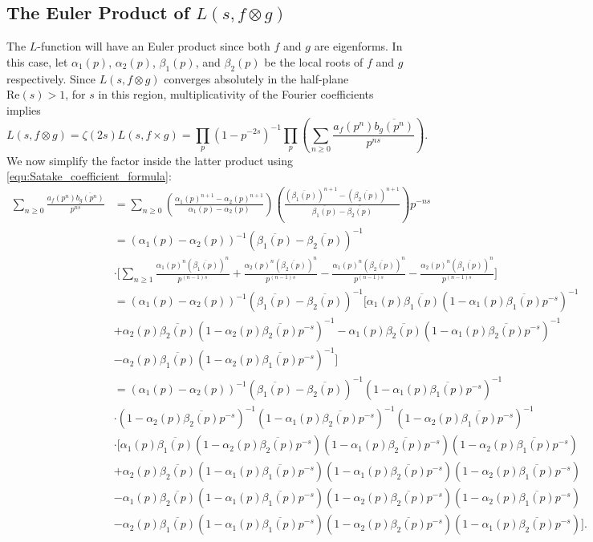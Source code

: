 \documentclass[12pt]{book}
\theoremstyle{definition}\newframedtheorem{method}{Method}
\renewcommand{\a}{\alpha}
\renewcommand{\b}{\beta}
\newcommand{\z}{\zeta}
\newcommand{\x}{\times}
\newcommand{\ox}{\otimes}
\newcommand{\<}{\langle}
\renewcommand{\>}{\rangle}
\newcommand{\conj}{\overline}
\renewcommand{\Re}{\mathrm{Re}}
\begin{document}
    \subsection*{The Euler Product of \texorpdfstring{$L(s,f \ox g)$}{L(s,fxg)}}
      The $L$-function will have an Euler product since both $f$ and $g$ are eigenforms. In this case, let $\a_{1}(p)$, $\a_{2}(p)$, $\b_{1}(p)$, and $\b_{2}(p)$ be the local roots of $f$ and $g$ respectively. Since $L(s,f \ox g)$ converges absolutely in the half-plane $\Re(s) > 1$, for $s$ in this region, multiplicativity of the Fourier coefficients implies
      \[
        L(s,f \ox g) = \z(2s)L(s,f \x g) = \prod_{p}(1-p^{-2s})^{-1}\prod_{p}\left(\sum_{n \ge 0}\frac{a_{f}(p^{n})\conj{b_{g}(p^{n})}}{p^{ns}}\right).
      \]
      We now simplify the factor inside the latter product using \cref{equ:Satake_coefficient_formula}:
      \begingroup
        \allowdisplaybreaks
        \begin{align*}
          \sum_{n \ge 0}\frac{a_{f}(p^{n})\conj{b_{g}(p^{n})}}{p^{ns}} &= \sum_{n \ge 0}\left(\frac{\a_{1}(p)^{n+1}-\a_{2}(p)^{n+1}}{\a_{1}(p)-\a_{2}(p)}\right)\left(\frac{(\conj{\b_{1}(p)})^{n+1}-(\conj{\b_{2}(p)})^{n+1}}{\conj{\b_{1}(p)}-\conj{\b_{2}(p)}}\right)p^{-ns} \\
          &= (\a_{1}(p)-\a_{2}(p))^{-1}(\conj{\b_{1}(p)}-\conj{\b_{2}(p)})^{-1} \\
          &\cdot \bigg[\sum_{n \ge 1}\frac{\a_{1}(p)^{n}(\conj{\b_{1}(p)})^{n}}{p^{(n-1)s}}+\frac{\a_{2}(p)^{n}(\conj{\b_{2}(p)})^{n}}{p^{(n-1)s}}-\frac{\a_{1}(p)^{n}(\conj{\b_{2}(p)})^{n}}{p^{(n-1)s}}-\frac{\a_{2}(p)^{n}(\conj{\b_{1}(p)})^{n}}{p^{(n-1)s}}\bigg] \\
          &= (\a_{1}(p)-\a_{2}(p))^{-1}(\conj{\b_{1}(p)}-\conj{\b_{2}(p)})^{-1}\bigg[\a_{1}(p)\conj{\b_{1}(p)}(1-\a_{1}(p)\conj{\b_{1}(p)}p^{-s})^{-1} \\
          &+\a_{2}(p)\conj{\b_{2}(p)}(1-\a_{2}(p)\conj{\b_{2}(p)}p^{-s})^{-1}-\a_{1}(p)\conj{\b_{2}(p)}(1-\a_{1}(p)\conj{\b_{2}(p)}p^{-s})^{-1} \\
          &-\a_{2}(p)\conj{\b_{1}(p)}(1-\a_{2}(p)\conj{\b_{1}(p)}p^{-s})^{-1}\bigg] \\
          &= (\a_{1}(p)-\a_{2}(p))^{-1}(\conj{\b_{1}(p)}-\conj{\b_{2}(p)})^{-1}(1-\a_{1}(p)\conj{\b_{1}(p)}p^{-s})^{-1} \\
          &\cdot(1-\a_{2}(p)\conj{\b_{2}(p)}p^{-s})^{-1}(1-\a_{1}(p)\conj{\b_{2}(p)}p^{-s})^{-1}(1-\a_{2}(p)\conj{\b_{1}(p)}p^{-s})^{-1} \\
          &\cdot\bigg[\a_{1}(p)\conj{\b_{1}(p)}(1-\a_{2}(p)\conj{\b_{2}(p)}p^{-s})(1-\a_{1}(p)\conj{\b_{2}(p)}p^{-s})(1-\a_{2}(p)\conj{\b_{1}(p)}p^{-s}) \\
          &+\a_{2}(p)\conj{\b_{2}(p)}(1-\a_{1}(p)\conj{\b_{1}(p)}p^{-s})(1-\a_{1}(p)\conj{\b_{2}(p)}p^{-s})(1-\a_{2}(p)\conj{\b_{1}(p)}p^{-s}) \\
          &-\a_{1}(p)\conj{\b_{2}(p)}(1-\a_{1}(p)\conj{\b_{1}(p)}p^{-s})(1-\a_{2}(p)\conj{\b_{2}(p)}p^{-s})(1-\a_{2}(p)\conj{\b_{1}(p)}p^{-s}) \\
          &-\a_{2}(p)\conj{\b_{1}(p)}(1-\a_{1}(p)\conj{\b_{1}(p)}p^{-s})(1-\a_{2}(p)\conj{\b_{2}(p)}p^{-s})(1-\a_{1}(p)\conj{\b_{2}(p)}p^{-s})\bigg].
        \end{align*}
\end{document}
